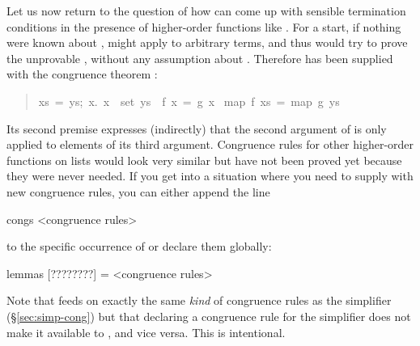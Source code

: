 \begin{isabelle}
\begin{isamarkuptext}
Let us now return to the question of how  can come up with sensible termination
conditions in the presence of higher-order functions like . For a start, if nothing
were known about ,  might apply  to arbitrary terms,
and thus  would try to prove the unprovable
, without any assumption about .
Therefore  has been supplied with the congruence theorem : 
\begin{quote}

\begin{isabelle}%
{\isasymlbrakk}\mbox{xs}\ =\ \mbox{ys};\ {\isasymAnd}\mbox{x}.\ \mbox{x}\ {\isasymin}\ set\ \mbox{ys}\ {\isasymLongrightarrow}\ \mbox{f}\ \mbox{x}\ =\ \mbox{g}\ \mbox{x}{\isasymrbrakk}\isanewline
{\isasymLongrightarrow}\ map\ \mbox{f}\ \mbox{xs}\ =\ map\ \mbox{g}\ \mbox{ys}
\end{isabelle}%

\end{quote}
Its second premise expresses (indirectly) that the second argument of  is only applied
to elements of its third argument. Congruence rules for other higher-order functions on lists would
look very similar but have not been proved yet because they were never needed.
If you get into a situation where you need to supply  with new congruence
rules, you can either append the line
\begin{ttbox}
congs <congruence rules>
\end{ttbox}
to the specific occurrence of  or declare them globally:
\begin{ttbox}
lemmas [????????] = <congruence rules>
\end{ttbox}

Note that  feeds on exactly the same \emph{kind} of
congruence rules as the simplifier (\S\ref{sec:simp-cong}) but that
declaring a congruence rule for the simplifier does not make it
available to , and vice versa. This is intentional.%
\end{isamarkuptext}%
\end{isabelle}%
